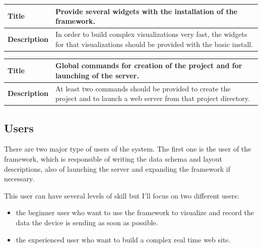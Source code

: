 \documentclass[12pt]{article}
\begin{document}
                \begin{tabularx}{\textwidth}{|l|X|}
                    \hline
                    \textbf{Title} & Provide several widgets with the
                    installation of the framework. \\
                    \hline
                    \textbf{Description} & In order to build complex
                    visualizations very fast, the widgets for that
                    visualizations should be provided with the basic install. \\
                    \hline
                \end{tabularx}

                \begin{tabularx}{\textwidth}{|l|X|}
                    \hline
                    \textbf{Title} & Global commands for creation of the project
                    and for launching of the server. \\
                    \hline
                    \textbf{Description} & At least two commands should be
                    provided to create the project and to launch a web server
                    from that project directory. \\
                    \hline
                \end{tabularx}
            \setlength{\parindent}{1cm}

        \subsection{Users}
            There are two major type of users of the system. The first one is
            the user of the framework, which is responsible of writing the data
            schema and layout descriptions, also of launching the server and
            expanding the framework if necessary.

            This user can have several levels of skill but I'll focus on two
            different users:
            \begin{itemize}
                \item the beginner user who want to use the framework to
                      visualize and record the data the device is sending as
                      soon as possible.
                \item the experienced user who want to build a complex real time
                      web site.
            \end{itemize}
\end{document}

